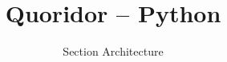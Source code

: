 \documentclass[a4paper,11pt]{article}
\title{Quoridor -- Python}
\author{Section Architecture}
\date{}
\begin{document}
\maketitle
\tableofcontents
\bigskip


\end{document}
